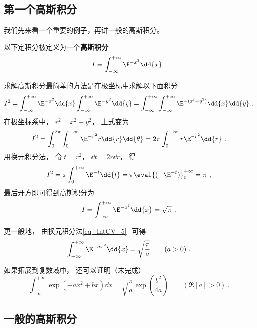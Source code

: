 

\subsection{第一个高斯积分}

我们先来看一个重要的例子，再讲一般的高斯积分。

以下定积分被定义为一个\textbf{高斯积分}
\begin{equation}
I = \int_{-\infty}^{+\infty} \E^{-x^2}\dd{x}~.
\end{equation}

求解高斯积分最简单的方法是在极坐标中求解以下面积分
\begin{equation}
I^2 = \int_{-\infty}^{+\infty} \E^{-x^2}\dd{x} \int_{-\infty}^{+\infty} \E^{-y^2}\dd{y}
=\int_{-\infty}^{+\infty}\int_{-\infty}^{+\infty} \E^{-(x^2 + y^2)} \dd{x}\dd{y}~.
\end{equation}
在极坐标系中， $r^2 = x^2 + y^2$， 上式变为
\begin{equation}
I^2 = \int_0^{2\pi} \int_0^{+\infty} \E^{-r^2} r\dd{r}\dd{\theta}
= 2\pi \int_0^{+\infty} r\E^{-r^2} \dd{r}~.
\end{equation}
用换元积分法， 令 $t = r^2$， $\dd{t} = 2r\dd{r}$， 得
\begin{equation}
I^2 = \pi \int_0^{+\infty} \E^{-t} \dd{t} = \pi \eval{(-\E^{-t})}_0^{+\infty} = \pi~,
\end{equation}
最后开方即可得到高斯积分为
\begin{equation}\label{eq_GsInt_1}
I = \int_{-\infty}^{+\infty} \E^{-x^2}\dd{x} = \sqrt{\pi}~.
\end{equation}

更一般地， 由换元积分法\autoref{eq_IntCV_5}~ 可得
\begin{equation}\label{eq_GsInt_5}
\int_{-\infty}^{+\infty} \E^{-a x^2}\dd{x} = \sqrt{\frac{\pi}{a}} \qquad (a > 0)~.
\end{equation}

如果拓展到复数域中， 还可以证明（未完成）
\begin{equation}\label{eq_GsInt_4}
\int_{-\infty}^{+\infty} \exp(-ax^2 + bx) \dd{x} = \sqrt{\frac{\pi}{a}} \exp(\frac{b^2}{4a}) \qquad (\Re[a] > 0)~.
\end{equation}


\subsection{一般的高斯积分}

